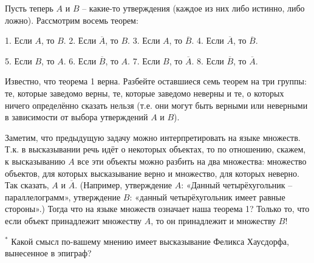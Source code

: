 \begin{thm} \label{8.1 thm3}
    Пусть теперь $A$ и $B$ – какие-то утверждения (каждое из них либо истинно, либо ложно). Рассмотрим восемь теорем:
    \par
    1. Если $A$, то $B$. \hfill 2. Если $\overline{A}$, то $B$. \hfill 3. Если $A$, то $\overline{B}$. \hfill 4. Если $\overline{A}$, то $\overline{B}$.
    \par
    5. Если $B$, то $A$. \hfill 6. Если $\overline{B}$, то $A$. \hfill 7. Если $B$, то $\overline{A}$. \hfill 8. Если $\overline{B}$, то $\overline{A}$.
    \par
    Известно, что теорема 1 верна. Разбейте оставшиеся семь теорем на три группы: те, которые заведомо верны, те, которые заведомо неверны и те, о которых ничего определённо сказать нельзя (т.е. они могут быть верными или неверными в зависимости от выбора утверждений $A$ и $B$).\footnotemark
\end{thm}

Заметим, что предыдущую задачу можно интерпретировать на языке множеств. Т.к. в высказывании речь идёт о некоторых объектах, то по отношению, скажем, к высказыванию $A$ все эти объекты можно разбить на два множества: множество объектов, для которых высказывание верно и множество, для которых неверно. Так сказать, $A$ и $\overline{A}$. (Например, утверждение $A$: «Данный четырёхугольник – параллелограмм», утверждение $B$: «данный четырёхугольник имеет равные стороны».) Тогда что на языке множеств означает наша теорема 1? Только то, что если объект принадлежит множеству $A$, то он принадлежит и множеству $B$!

\begin{thm} $^*$
    Какой смысл по-вашему мнению имеет высказывание Феликса Хаусдорфа, вынесенное в эпиграф?
\end{thm}

